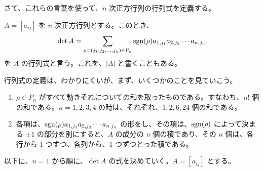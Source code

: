 \medskip
さて、これらの言葉を使って、$n$ 次正方行列の行列式を定義する。

\begin{definition}
$A = [a_{ij}]$ を $n$ 次正方行列とする。このとき、
$$\det A = \sum_{\rho = (j_1,j_2,\ldots,j_n)\in P_n} \mbox{{\rm sgn}}(\rho)a_{1,j_1}a_{2,j_2}\cdots a_{n,j_n}$$
を $A$ の{\gt 行列式}と言う。これを、$|A|$ と書くこともある。
\end{definition}

行列式の定義は、わかりにくいが、まず、いくつかのことを見ていこう。
\begin{enumerate}
\item $\rho\in P_n$ がすべて動きそれについての和を取ったものである。すなわち、$n!$ 個の和である。$n=1, 2, 3, 4$ の時は、それぞれ、$1, 2, 6, 24$ 個の和である。
\item 各項は、$\mbox{{\rm sgn}}(\rho)a_{1,j_1}a_{2,j_2}\cdots a_{n.j_n}$ の形をし、その項は、$\mbox{{\rm sgn}}(\rho)$ によって決まる $\pm 1$ の部分を別にすると、$A$ の成分の $n$ 個の積であり、その $n$ 個は、各行から 1 つずつ、各列から、1 つずつとった積である。
\end{enumerate}

以下に、$n = 1$ から順に、$\det A$ の式を決めていく。$A = [a_{ij}]$ とする。

